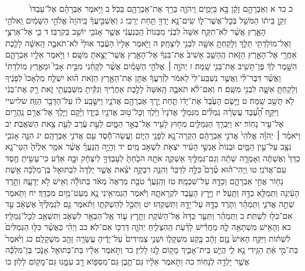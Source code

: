 \documentclass[twoside, openany, parskip=half, 11pt]{book}
\begin{document}
　　　כ כד א וְאַבְרָהָ֣ם זָקֵ֔ן בָּ֖א בַּיָּמִ֑ים וַֽיהֹוָ֛ה בֵּרַ֥ךְ אֶת־אַבְרָהָ֖ם בַּכֹּֽל׃ ב וַיֹּ֣אמֶר אַבְרָהָ֗ם אֶל־עַבְדּוֹ֙ זְקַ֣ן בֵּית֔וֹ הַמֹּשֵׁ֖ל בְּכׇל־אֲשֶׁר־ל֑וֹ שִֽׂים־נָ֥א יָדְךָ֖ תַּ֥חַת יְרֵכִֽי׃ ג וְאַשְׁבִּ֣יעֲךָ֔ בַּֽיהֹוָה֙ אֱלֹהֵ֣י הַשָּׁמַ֔יִם וֵֽאלֹהֵ֖י הָאָ֑רֶץ אֲשֶׁ֨ר לֹֽא־תִקַּ֤ח אִשָּׁה֙ לִבְנִ֔י מִבְּנוֹת֙ הַֽכְּנַעֲנִ֔י אֲשֶׁ֥ר אָנֹכִ֖י יוֹשֵׁ֥ב בְּקִרְבּֽוֹ׃ ד כִּ֧י אֶל־אַרְצִ֛י וְאֶל־מוֹלַדְתִּ֖י תֵּלֵ֑ךְ וְלָקַחְתָּ֥ אִשָּׁ֖ה לִבְנִ֥י לְיִצְחָֽק׃ ה וַיֹּ֤אמֶר אֵלָיו֙ הָעֶ֔בֶד אוּלַי֙ לֹא־תֹאבֶ֣ה הָֽאִשָּׁ֔ה לָלֶ֥כֶת אַחֲרַ֖י אֶל־הָאָ֣רֶץ הַזֹּ֑את הֶֽהָשֵׁ֤ב אָשִׁיב֙ אֶת־בִּנְךָ֔ אֶל־הָאָ֖רֶץ אֲשֶׁר־יָצָ֥אתָ מִשָּֽׁם׃ ו וַיֹּ֥אמֶר אֵלָ֖יו אַבְרָהָ֑ם הִשָּׁ֣מֶר לְךָ֔ פֶּן־תָּשִׁ֥יב אֶת־בְּנִ֖י שָֽׁמָּה׃ ז יְהֹוָ֣ה ׀ אֱלֹהֵ֣י הַשָּׁמַ֗יִם אֲשֶׁ֨ר לְקָחַ֜נִי מִבֵּ֣ית אָבִי֮ וּמֵאֶ֣רֶץ מֽוֹלַדְתִּי֒ וַאֲשֶׁ֨ר דִּבֶּר־לִ֜י וַאֲשֶׁ֤ר נִֽשְׁבַּֽע־לִי֙ לֵאמֹ֔ר לְזַ֨רְעֲךָ֔ אֶתֵּ֖ן אֶת־הָאָ֣רֶץ הַזֹּ֑את ה֗וּא יִשְׁלַ֤ח מַלְאָכוֹ֙ לְפָנֶ֔יךָ וְלָקַחְתָּ֥ אִשָּׁ֛ה לִבְנִ֖י מִשָּֽׁם׃ ח וְאִם־לֹ֨א תֹאבֶ֤ה הָֽאִשָּׁה֙ לָלֶ֣כֶת אַחֲרֶ֔יךָ וְנִקִּ֕יתָ מִשְּׁבֻעָתִ֖י זֹ֑את רַ֣ק אֶת־בְּנִ֔י לֹ֥א תָשֵׁ֖ב שָֽׁמָּה׃ ט וַיָּ֤שֶׂם הָעֶ֙בֶד֙ אֶת־יָד֔וֹ תַּ֛חַת יֶ֥רֶךְ אַבְרָהָ֖ם אֲדֹנָ֑יו וַיִּשָּׁ֣בַֽע ל֔וֹ עַל־הַדָּבָ֖ר הַזֶּֽה׃ שלישיי וַיִּקַּ֣ח הָ֠עֶ֠בֶד עֲשָׂרָ֨ה גְמַלִּ֜ים מִגְּמַלֵּ֤י אֲדֹנָיו֙ וַיֵּ֔לֶךְ וְכׇל־ט֥וּב אֲדֹנָ֖יו בְּיָד֑וֹ וַיָּ֗קׇם וַיֵּ֛לֶךְ אֶל־אֲרַ֥ם נַֽהֲרַ֖יִם אֶל־עִ֥יר נָחֽוֹר׃ יא וַיַּבְרֵ֧ךְ הַגְּמַלִּ֛ים מִח֥וּץ לָעִ֖יר אֶל־בְּאֵ֣ר הַמָּ֑יִם לְעֵ֣ת עֶ֔רֶב לְעֵ֖ת צֵ֥את הַשֹּׁאֲבֹֽת׃ יב וַיֹּאמַ֓ר ׀ יְהֹוָ֗ה אֱלֹהֵי֙ אֲדֹנִ֣י אַבְרָהָ֔ם הַקְרֵה־נָ֥א לְפָנַ֖י הַיּ֑וֹם וַעֲשֵׂה־חֶ֕סֶד עִ֖ם אֲדֹנִ֥י אַבְרָהָֽם׃ יג הִנֵּ֛ה אָנֹכִ֥י נִצָּ֖ב עַל־עֵ֣ין הַמָּ֑יִם וּבְנוֹת֙ אַנְשֵׁ֣י הָעִ֔יר יֹצְאֹ֖ת לִשְׁאֹ֥ב מָֽיִם׃ יד וְהָיָ֣ה הַֽנַּעֲרָ֗ אֲשֶׁ֨ר אֹמַ֤ר אֵלֶ֙יהָ֙ הַטִּי־נָ֤א כַדֵּךְ֙ וְאֶשְׁתֶּ֔ה וְאָמְרָ֣ה שְׁתֵ֔ה וְגַם־גְּמַלֶּ֖יךָ אַשְׁקֶ֑ה אֹתָ֤הּ הֹכַ֙חְתָּ֙ לְעַבְדְּךָ֣ לְיִצְחָ֔ק וּבָ֣הּ אֵדַ֔ע כִּי־עָשִׂ֥יתָ חֶ֖סֶד עִם־אֲדֹנִֽי׃ טו וַֽיְהִי־ה֗וּא טֶ֘רֶם֮ כִּלָּ֣ה לְדַבֵּר֒ וְהִנֵּ֧ה רִבְקָ֣ה יֹצֵ֗את אֲשֶׁ֤ר יֻלְּדָה֙ לִבְתוּאֵ֣ל בֶּן־מִלְכָּ֔ה אֵ֥שֶׁת נָח֖וֹר אֲחִ֣י אַבְרָהָ֑ם וְכַדָּ֖הּ עַל־שִׁכְמָֽהּ׃ טז וְהַֽנַּעֲרָ֗ טֹבַ֤ת מַרְאֶה֙ מְאֹ֔ד בְּתוּלָ֕ה וְאִ֖ישׁ לֹ֣א יְדָעָ֑הּ וַתֵּ֣רֶד הָעַ֔יְנָה וַתְּמַלֵּ֥א כַדָּ֖הּ וַתָּֽעַל׃ יז וַיָּ֥רׇץ הָעֶ֖בֶד לִקְרָאתָ֑הּ וַיֹּ֕אמֶר הַגְמִיאִ֥ינִי נָ֛א מְעַט־מַ֖יִם מִכַּדֵּֽךְ׃ יח וַתֹּ֖אמֶר שְׁתֵ֣ה אֲדֹנִ֑י וַתְּמַהֵ֗ר וַתֹּ֧רֶד כַּדָּ֛הּ עַל־יָדָ֖הּ וַתַּשְׁקֵֽהוּ׃ יט וַתְּכַ֖ל לְהַשְׁקֹת֑וֹ וַתֹּ֗אמֶר גַּ֤ם לִגְמַלֶּ֙יךָ֙ אֶשְׁאָ֔ב עַ֥ד אִם־כִּלּ֖וּ לִשְׁתֹּֽת׃ כ וַתְּמַהֵ֗ר וַתְּעַ֤ר כַּדָּהּ֙ אֶל־הַשֹּׁ֔קֶת וַתָּ֥רׇץ ע֛וֹד אֶֽל־הַבְּאֵ֖ר לִשְׁאֹ֑ב וַתִּשְׁאַ֖ב לְכׇל־גְּמַלָּֽיו׃ כא וְהָאִ֥ישׁ מִשְׁתָּאֵ֖ה לָ֑הּ מַחֲרִ֕ישׁ לָדַ֗עַת הַֽהִצְלִ֧יחַ יְהֹוָ֛ה דַּרְכּ֖וֹ אִם־לֹֽא׃ כב וַיְהִ֗י כַּאֲשֶׁ֨ר כִּלּ֤וּ הַגְּמַלִּים֙ לִשְׁתּ֔וֹת וַיִּקַּ֤ח הָאִישׁ֙ נֶ֣זֶם זָהָ֔ב בֶּ֖קַע מִשְׁקָל֑וֹ וּשְׁנֵ֤י צְמִידִים֙ עַל־יָדֶ֔יהָ עֲשָׂרָ֥ה זָהָ֖ב מִשְׁקָלָֽם׃ כג וַיֹּ֙אמֶר֙ בַּת־מִ֣י אַ֔תְּ הַגִּ֥ידִי נָ֖א לִ֑י הֲיֵ֧שׁ בֵּית־אָבִ֛יךְ מָק֥וֹם לָ֖נוּ לָלִֽין׃ כד וַתֹּ֣אמֶר אֵלָ֔יו בַּת־בְּתוּאֵ֖ל אָנֹ֑כִי בֶּן־מִלְכָּ֕ה אֲשֶׁ֥ר יָלְדָ֖ה לְנָחֽוֹר׃ כה וַתֹּ֣אמֶר אֵלָ֔יו גַּם־תֶּ֥בֶן גַּם־מִסְפּ֖וֹא רַ֣ב עִמָּ֑נוּ גַּם־מָק֖וֹם לָלֽוּן׃ כו 
\end{document}
